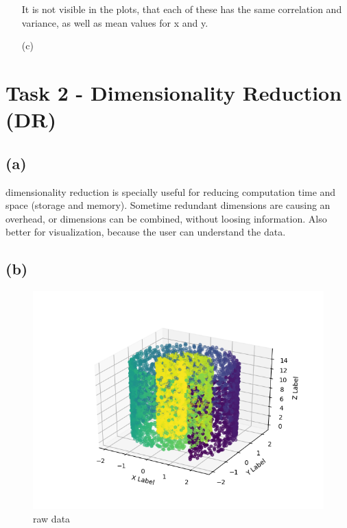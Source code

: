 \documentclass[a4paper]{article}
\begin{document}
\begin{enumerate}
	It is not visible in the plots, that each of these has the same correlation and variance, as well as mean values for x and y. 
	
	\item[(c)] 
	
\end{enumerate}

\newpage
\section*{Task 2 - Dimensionality Reduction (DR)}

\subsection*{(a)}
dimensionality reduction is specially useful for reducing computation time and space (storage and memory). Sometime redundant dimensions are causing an overhead, or dimensions can be combined, without loosing information. Also better for visualization, because the user can understand the data.

\subsection*{(b)}
\begin{figure}[!ht]
	\centering
	\includegraphics[width=0.7\linewidth]{swiss_roll}
	\caption{raw data}
\end{figure}
\end{document}

